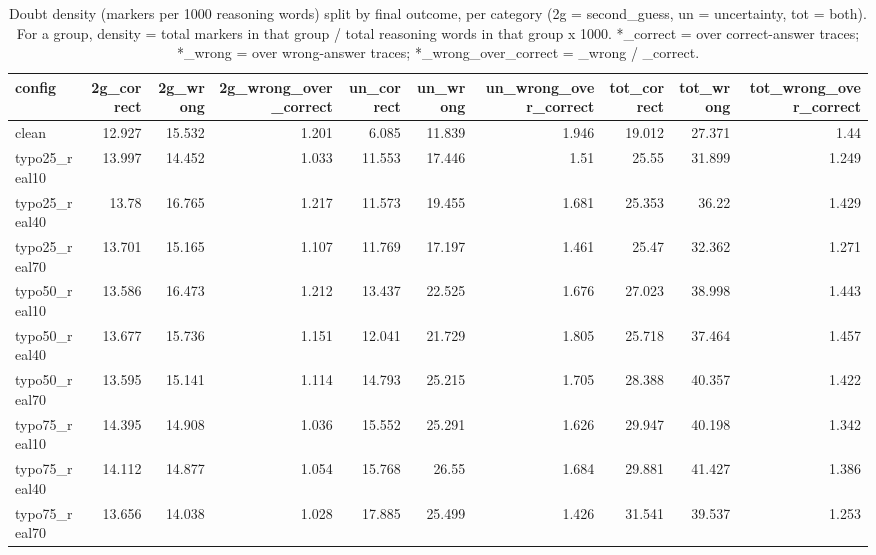 \documentclass[11pt]{article}
\begin{document}
\begin{table}[H]
\centering
\caption{Doubt density (markers per 1000 reasoning words) split by final outcome, per category (2g = second\_guess, un = uncertainty, tot = both). For a group, density = total markers in that group / total reasoning words in that group x 1000. *\_correct = over correct-answer traces; *\_wrong = over wrong-answer traces; *\_wrong\_over\_correct = \_wrong / \_correct.}
\small
\begin{adjustbox}{max width=\textwidth}
\begin{tabular}{lrrrrrrrrr}
\toprule
\textbf{config} & \textbf{2g\_correct} & \textbf{2g\_wrong} & \textbf{2g\_wrong\_over\_correct} & \textbf{un\_correct} & \textbf{un\_wrong} & \textbf{un\_wrong\_over\_correct} & \textbf{tot\_correct} & \textbf{tot\_wrong} & \textbf{tot\_wrong\_over\_correct} \\
\midrule
clean & 12.927 & 15.532 & 1.201 & 6.085 & 11.839 & 1.946 & 19.012 & 27.371 & 1.44 \\
typo25\_real10 & 13.997 & 14.452 & 1.033 & 11.553 & 17.446 & 1.51 & 25.55 & 31.899 & 1.249 \\
typo25\_real40 & 13.78 & 16.765 & 1.217 & 11.573 & 19.455 & 1.681 & 25.353 & 36.22 & 1.429 \\
typo25\_real70 & 13.701 & 15.165 & 1.107 & 11.769 & 17.197 & 1.461 & 25.47 & 32.362 & 1.271 \\
typo50\_real10 & 13.586 & 16.473 & 1.212 & 13.437 & 22.525 & 1.676 & 27.023 & 38.998 & 1.443 \\
typo50\_real40 & 13.677 & 15.736 & 1.151 & 12.041 & 21.729 & 1.805 & 25.718 & 37.464 & 1.457 \\
typo50\_real70 & 13.595 & 15.141 & 1.114 & 14.793 & 25.215 & 1.705 & 28.388 & 40.357 & 1.422 \\
typo75\_real10 & 14.395 & 14.908 & 1.036 & 15.552 & 25.291 & 1.626 & 29.947 & 40.198 & 1.342 \\
typo75\_real40 & 14.112 & 14.877 & 1.054 & 15.768 & 26.55 & 1.684 & 29.881 & 41.427 & 1.386 \\
typo75\_real70 & 13.656 & 14.038 & 1.028 & 17.885 & 25.499 & 1.426 & 31.541 & 39.537 & 1.253 \\
\bottomrule
\end{tabular}
\end{adjustbox}
\end{table}
\end{document}
